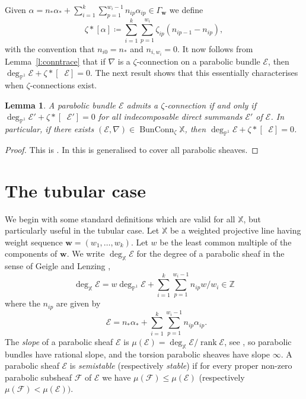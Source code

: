 \documentclass[12pt,a4paper]{amsart}
\theoremstyle{plain}
\newtheorem{lem}[thm]{Lemma}
\newcommand{\Z}{\mathbb Z}
\newcommand{\PP}{\mathbb P}
\DeclareMathOperator{\rank}{rank}
\DeclareMathOperator{\BunConn}{BunConn}
\DeclareMathOperator{\dimv}{\underline\dim}
\newcommand{\F}{\mathcal F}
\newcommand{\E}{\mathcal E}
\newcommand{\XX}{\mathbb X}
\newcommand{\bw}{\mathbf w}
\begin{document}
Given $\alpha = n_* \alpha_* + \sum_{i=1}^k \sum_{p=1}^{w_i-1} n_{ip} \alpha_{ip}\in\Gamma_\bw$ we define
\[ \zeta*{[\alpha]} \coloneqq \sum_{i=1}^k \sum_{p=1}^{w_i} \zeta_{ip}{(n_{ip-1} - n_{ip})}, \]
with the convention that $n_{i0} = n_*$ and $n_{i,w_i}=0$. It now follows from Lemma~\ref{l:conntrace} that if $\nabla$ is a $\zeta$-connection on a parabolic bundle $\E$, then $\deg_{\PP^1}\E+\zeta\ast[\dimv\E]=0$. The next result shows that this essentially characterises when $\zeta$-connections exist.

\begin{lem}
\label{l:degdimconn}
A parabolic bundle $\E$ admits a $\zeta$-connection if and only if $\deg_{\PP^1} \E' +\zeta*[\dimv \E']=0$ for all indecomposable direct summands $\E'$ of $\E$. In particular, if there exists $(\E,\nabla)\in\BunConn_\zeta\XX$, then $\deg_{\PP^1} \E +\zeta*[\dimv \E]=0$.
\end{lem}

\begin{proof}
This is \cite[Theorem 7.1]{CBipb}. In \cite{Hh} this is generalised to cover all parabolic sheaves.
\end{proof}






























\section{The tubular case}
\label{s:tub}

We begin with some standard definitions which are valid for all $\XX$, but particularly useful in the tubular case. Let $\XX$ be a weighted projective line having weight sequence $\bw = (w_1,\dots,w_k)$. Let $w$ be the least common multiple of the components of $\bw$. We write $\deg_{\XX} \E$ for the degree of a parabolic sheaf in the sense of Geigle and Lenzing \cite[Proposition 2.8]{GL},
\[
\deg_{\XX} \E = w \deg_{\PP^1} \E + \sum_{i=1}^k \sum_{p=1}^{w_i-1} n_{ip} w/w_i \in \Z
\]
where  the $n_{ip}$ are given by
\[
\dimv \E = n_* \alpha_* + \sum_{i=1}^k \sum_{p=1}^{w_i-1} n_{ip} \alpha_{ip}.
\]
The \emph{slope} of a parabolic sheaf $\E$ is $\mu(\E) = \deg_{\XX} \E / \rank \E$, see \cite[\S 2.5]{LM},
so parabolic bundles have rational slope, and the torsion parabolic sheaves have slope $\infty$.
A parabolic sheaf $\E$ is \emph{semistable} (respectively \emph{stable}) if for every proper non-zero parabolic subsheaf $\F$ of $\E$ we have $\mu(\F)\le \mu(\E)$ (respectively $\mu(\F)<\mu(\E))$.
\end{document}
